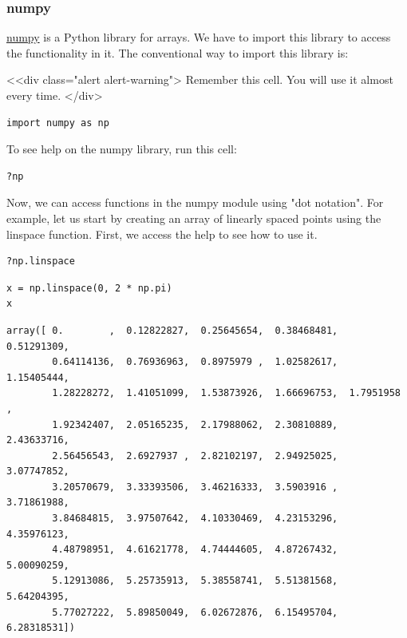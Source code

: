 \documentclass[11pt]{article}
\begin{document}
\subsubsection{numpy}
\label{sec:org690cf0a}

\href{http://www.numpy.org}{numpy} is a Python library for arrays. We have to import this library to access the functionality in it. The conventional way to import this library is:

<<div class="alert alert-warning">
Remember this cell. You will use it almost every time.
</div>
\begin{verbatim}
import numpy as np
\end{verbatim}

To see help on the numpy library, run this cell:

\begin{verbatim}
?np
\end{verbatim}


Now, we can access functions in the numpy module using "dot notation". For example, let us start by creating an array of linearly spaced points using the linspace function. First, we access the help to see how to use it.

\begin{verbatim}
?np.linspace
\end{verbatim}

\begin{verbatim}
x = np.linspace(0, 2 * np.pi)
x
\end{verbatim}

\begin{verbatim}
array([ 0.        ,  0.12822827,  0.25645654,  0.38468481,  0.51291309,
        0.64114136,  0.76936963,  0.8975979 ,  1.02582617,  1.15405444,
        1.28228272,  1.41051099,  1.53873926,  1.66696753,  1.7951958 ,
        1.92342407,  2.05165235,  2.17988062,  2.30810889,  2.43633716,
        2.56456543,  2.6927937 ,  2.82102197,  2.94925025,  3.07747852,
        3.20570679,  3.33393506,  3.46216333,  3.5903916 ,  3.71861988,
        3.84684815,  3.97507642,  4.10330469,  4.23153296,  4.35976123,
        4.48798951,  4.61621778,  4.74444605,  4.87267432,  5.00090259,
        5.12913086,  5.25735913,  5.38558741,  5.51381568,  5.64204395,
        5.77027222,  5.89850049,  6.02672876,  6.15495704,  6.28318531])
\end{verbatim}
\end{document}
